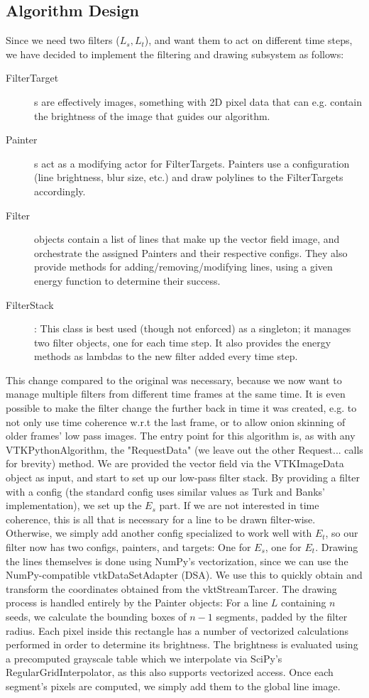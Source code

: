 \subsection{Algorithm Design}
Since we need two filters ($L_s, L_t$), and want them to act on different time steps, we have decided to implement the filtering and drawing subsystem as follows:
\begin{description}
   \item[FilterTarget]s are effectively images, something with 2D pixel data that can e.g. contain the brightness of the image that guides our algorithm.
   \item[Painter]s act as a modifying actor for FilterTargets. Painters use a configuration (line brightness, blur size, etc.) and draw polylines to the FilterTargets accordingly.
   \item[Filter] objects contain a list of lines that make up the vector field image, and orchestrate the assigned Painters and their respective configs.
   They also provide methods for adding/removing/modifying lines, using a given energy function to determine their success.
   \item[FilterStack]: This class is best used (though not enforced) as a singleton; it manages two filter objects, one for each time step.
   It also provides the energy methods as lambdas to the new filter added every time step.
\end{description}
This change compared to the original was necessary, because we now want to manage multiple filters from different time frames at the same time.
It is even possible to make the filter change the further back in time it was created, e.g. to not only use time coherence w.r.t the last frame,
or to allow onion skinning of older frames' low pass images.
\noindent
The entry point for this algorithm is, as with any VTKPythonAlgorithm, the "RequestData" (we leave out the other Request... calls for brevity) method.
We are provided the vector field via the VTKImageData object as input, and start to set up our low-pass filter stack.
By providing a filter with a config (the standard config uses similar values as Turk and Banks' implementation), we set up the $E_s$ part.
If we are not interested in time coherence, this is all that is necessary for a line to be drawn filter-wise.
Otherwise, we simply add another config specialized to work well with $E_t$, so our filter now has two configs, painters, and targets: One for $E_s$, one for $E_t$.
Drawing the lines themselves is done using NumPy's vectorization, since we can use the NumPy-compatible vtkDataSetAdapter (DSA).
We use this to quickly obtain and transform the coordinates obtained from the vktStreamTarcer.
The drawing process is handled entirely by the Painter objects:
For a line $L$ containing $n$ seeds, we calculate the bounding boxes of $n-1$ segments, padded by the filter radius.
Each pixel inside this rectangle has a number of vectorized calculations performed in order to determine its brightness.
The brightness is evaluated using a precomputed grayscale table which we interpolate via SciPy's RegularGridInterpolator, as this also supports vectorized access.
Once each segment's pixels are computed, we simply add them to the global line image.

